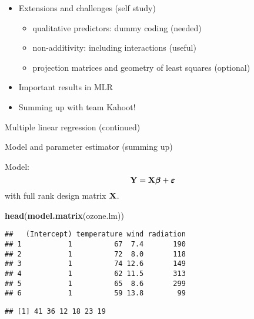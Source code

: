 \documentclass[ignorenonframetext,]{beamer}
\newenvironment{Shaded}{\begin{snugshade}}{\end{snugshade}}
\newcommand{\KeywordTok}[1]{\textcolor[rgb]{0.13,0.29,0.53}{\textbf{#1}}}
\newcommand{\OperatorTok}[1]{\textcolor[rgb]{0.81,0.36,0.00}{\textbf{#1}}}
\newcommand{\NormalTok}[1]{#1}
\providecommand{\tightlist}{%
  \setlength{\itemsep}{0pt}\setlength{\parskip}{0pt}}
\begin{document}
\begin{frame}

\begin{itemize}
\tightlist
\item
  Extensions and challenges (self study)

  \begin{itemize}
  \tightlist
  \item
    qualitative predictors: dummy coding (needed)
  \item
    non-additivity: including interactions (useful)
  \item
    projection matrices and geometry of least squares (optional)
  \end{itemize}
\item
  Important results in MLR
\item
  Summing up with team Kahoot!
\end{itemize}

\end{frame}

\begin{frame}[fragile]{Multiple linear regression (continued)}

\begin{block}{Model and parameter estimator (summing up)}

Model: \[{\bf Y}=\bf X \boldsymbol{\beta}+{\boldsymbol{\varepsilon}}\]
with full rank design matrix \({\bf X}\).

\small

\begin{Shaded}
\begin{Highlighting}[]
\KeywordTok{head}\NormalTok{(}\KeywordTok{model.matrix}\NormalTok{(ozone.lm))}
\end{Highlighting}
\end{Shaded}

\begin{verbatim}
##   (Intercept) temperature wind radiation
## 1           1          67  7.4       190
## 2           1          72  8.0       118
## 3           1          74 12.6       149
## 4           1          62 11.5       313
## 5           1          65  8.6       299
## 6           1          59 13.8        99
\end{verbatim}

\begin{Shaded}
\end{Shaded}

\begin{verbatim}
## [1] 41 36 12 18 23 19
\end{verbatim}

\normalsize

\end{block}

\end{frame}
\end{document}
